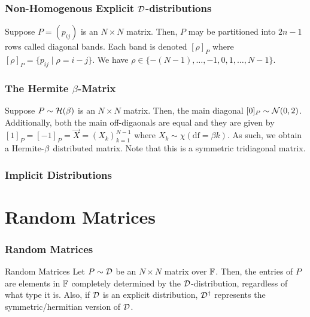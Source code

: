 \begin{frame} \frametitle{Non-Homogenous Explicit $\mathcal{D}$-distributions}

  \begin{alertblock}{}
    Suppose $P = (p_{ij})$ is an $N \times N$ matrix. Then, $P$ may be partitioned into $2n - 1$ rows called diagonal bands. Each band is denoted $[\rho]_P$ where $[\rho]_P = \{p_{ij} \mid \rho = i - j\}$. We have
    $\rho \in \{ -(N-1), \dots, -1, 0, 1, \dots, N-1 \}$.
  \end{alertblock}

\end{frame}
\begin{frame} \frametitle{The Hermite $\beta$-Matrix}

  \begin{alertblock}{}
    Suppose $P \sim \mathcal{H}(\beta)$ is an $N \times N$ matrix. Then, the main diagonal $[0]_P \sim \mathcal{N}(0,2)$.
    Additionally, both the main off-digaonals are equal and they are given by $[1]_{P} = [-1]_{P} = \vec{X} = (X_k)_{k=1}^{N-1}$ where $X_k \sim \chi(\text{df} = \beta k)$.
    As such, we obtain a Hermite-$\beta$ distributed matrix. Note that this is a symmetric tridiagonal matrix.
  \end{alertblock}

\end{frame}
\begin{frame} \frametitle{Implicit Distributions}



\end{frame}


\section{Random Matrices}
\begin{frame} \frametitle{Random Matrices}

\begin{alertblock}{Random Matrices}
Let $P \sim \mathcal{D}$ be an $N \times N$ matrix over $\mathbb{F}$. Then, the entries of $P$ are elements in $\mathbb{F}$ completely determined by the $\mathcal{D}$-distribution, regardless of what type it is.
Also, if $\mathcal{D}$ is an explicit distribution, $\mathcal{D}^\dagger$ represents the symmetric/hermitian version of $\mathcal{D}$.
\end{alertblock}
\end{frame}

